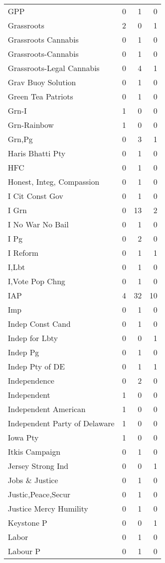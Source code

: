 \begin{supertabular}{lrrr}
GPP & 0 & 1 & 0\\
Grassroots & 2 & 0 & 1\\
Grassroots Cannabis & 0 & 1 & 0\\
Grassroots-Cannabis & 0 & 1 & 0\\
Grassroots-Legal Cannabis & 0 & 4 & 1\\
Grav Buoy Solution & 0 & 1 & 0\\
Green Tea Patriots & 0 & 1 & 0\\
Grn-I & 1 & 0 & 0\\
Grn-Rainbow & 1 & 0 & 0\\
Grn,Pg & 0 & 3 & 1\\
Haris Bhatti Pty & 0 & 1 & 0\\
HFC & 0 & 1 & 0\\
Honest, Integ, Compassion & 0 & 1 & 0\\
I Cit Const Gov & 0 & 1 & 0\\
I Grn & 0 & 13 & 2\\
I No War No Bail & 0 & 1 & 0\\
I Pg & 0 & 2 & 0\\
I Reform & 0 & 1 & 1\\
I,Lbt & 0 & 1 & 0\\
I,Vote Pop Chng & 0 & 1 & 0\\
IAP & 4 & 32 & 10\\
Imp & 0 & 1 & 0\\
Indep Const Cand & 0 & 1 & 0\\
Indep for Lbty & 0 & 0 & 1\\
Indep Pg & 0 & 1 & 0\\
Indep Pty of DE & 0 & 1 & 1\\
Independence & 0 & 2 & 0\\
Independent & 1 & 0 & 0\\
Independent American & 1 & 0 & 0\\
Independent Party of Delaware & 1 & 0 & 0\\
Iowa Pty & 1 & 0 & 0\\
Itkis Campaign & 0 & 1 & 0\\
Jersey Strong Ind & 0 & 0 & 1\\
Jobs \& Justice & 0 & 1 & 0\\
Justic,Peace,Secur & 0 & 1 & 0\\
Justice Mercy Humility & 0 & 1 & 0\\
Keystone P & 0 & 0 & 1\\
Labor & 0 & 1 & 0\\
Labour P & 0 & 1 & 0\\

\end{supertabular}

